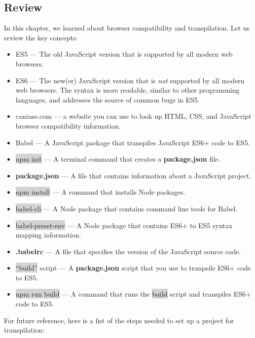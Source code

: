 \documentclass[11pt]{article}
\begin{document}
\subsection{Review}
In this chapter, we learned about browser compatibility and transpilation. Let us review the key concepts:
\begin{itemize}[leftmargin = *]
\item ES5 — The old JavaScript version that is supported by all modern web browsers.
\item ES6 — The new(er) JavaScript version that is \textit{not} supported by all modern web browsers. The syntax is more readable, similar to other programming languages, and addresses the source of common bugs in ES5.
\item caniuse.com — a website you can use to look up HTML, CSS, and JavaScript browser compatibility information.
\item Babel — A JavaScript package that transpiles JavaScript ES6+ code to ES5.
\item \colorbox{lightgray}{npm init} — A terminal command that creates a \textbf{package.json} file.
\item \textbf{package.json} — A file that contains information about a JavaScript project.
\item \colorbox{lightgray}{npm install} — A command that installs Node packages.
\item \colorbox{lightgray}{babel-cli} — A Node package that contains command line tools for Babel.
\item \colorbox{lightgray}{babel-preset-env} — A Node package that contains ES6+ to ES5 syntax mapping information.
\item \textbf{.babelrc} — A file that specifies the version of the JavaScript source code.
\item \colorbox{lightgray}{``build''} script — A \textbf{package.json} script that you use to tranpsile ES6+ code to ES5.
\item \colorbox{lightgray}{npm run build} — A command that runs the \colorbox{lightgray}{build} script and transpiles ES6+ code to ES5.
\end{itemize}
For future reference, here is a list of the steps needed to set up a project for transpilation:
\end{document}
